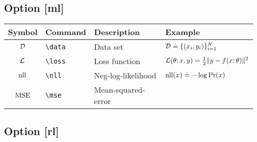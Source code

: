 \documentclass{article}
\begin{document}
\subsection*{Option [ml]}

\begin{tabular}{clll}
  \toprule
  Symbol & Command & Description & Example \\
  \midrule
  ${\mathcal{D}}$ & \verb|\data| & Data set & ${\mathcal{D}} \doteq \{ (x_i, y_i) \}_{i=1}^N$ \\
  $\mathcal{L}$ & \verb|\loss| & Loss function & $\mathcal{L}(\theta; x, y) = \frac{1}{2} \| y - f(x; \theta) \|^2$ \\
  $\operatorname{nll}$ & \verb|\nll| & Neg-log-likelihood & $\operatorname{nll}(x) \doteq -\log\Pr(x)$ \\
  $\operatorname{MSE}$ & \verb|\mse| & Mean-squared-error & \\
  \bottomrule
\end{tabular}

\subsection*{Option [rl]}
\end{document}
